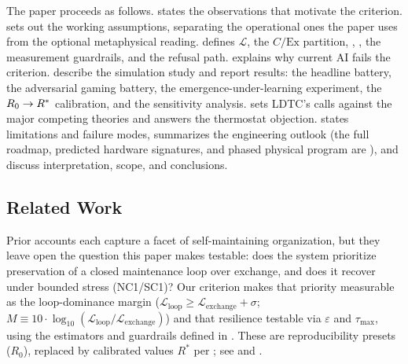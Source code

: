 \documentclass[11pt]{article}
\begin{document}
The paper proceeds as follows.  states the observations that motivate the criterion.  sets out the working assumptions, separating the operational ones the paper uses from the optional metaphysical reading.  defines $\mathcal{L}$, the $C/\text{Ex}$ partition, \NC, \SC, the measurement guardrails, and the refusal path.  explains why current AI fails the criterion.  describe the simulation study and report results: the headline battery, the adversarial gaming battery, the emergence-under-learning experiment, the $R_0 \rightarrow R^*$ calibration, and the sensitivity analysis.  sets LDTC's calls against the major competing theories and answers the thermostat objection.  states limitations and failure modes,  summarizes the engineering outlook (the full roadmap, predicted hardware signatures, and phased physical program are ), and  discuss interpretation, scope, and conclusions.

\subsection{Related Work}

Prior accounts each capture a facet of self-maintaining organization, but they leave open the question this paper makes testable: does the system prioritize preservation of a closed maintenance loop over exchange, and does it recover under bounded stress (NC1/SC1)? Our criterion makes that priority measurable as the loop-dominance margin ($\mathcal{L}_{\text{loop}} \geq \mathcal{L}_{\text{exchange}} + \sigma$; $M \equiv 10 \cdot \log_{10}(\mathcal{L}_{\text{loop}}/\mathcal{L}_{\text{exchange}})$) and that resilience testable via $\varepsilon$ and $\tau_{\max}$, using the estimators and guardrails defined in . These are reproducibility presets ($R_0$), replaced by calibrated values $R^*$ per ; see  and .
\end{document}
